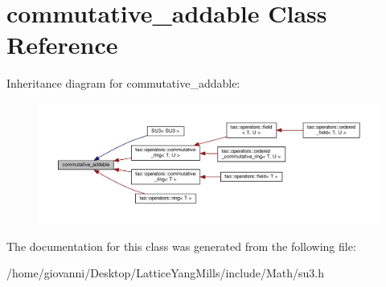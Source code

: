 \hypertarget{classtao_1_1operators_1_1commutative__addable}{}\section{commutative\+\_\+addable Class Reference}
\label{classtao_1_1operators_1_1commutative__addable}


Inheritance diagram for commutative\+\_\+addable\+:\nopagebreak
\begin{figure}[H]
\begin{center}
\leavevmode
\includegraphics[width=350pt]{classtao_1_1operators_1_1commutative__addable__inherit__graph}
\end{center}
\end{figure}


The documentation for this class was generated from the following file\+:\begin{DoxyCompactItemize}
\item 
/home/giovanni/\+Desktop/\+Lattice\+Yang\+Mills/include/\+Math/su3.\+h\end{DoxyCompactItemize}
